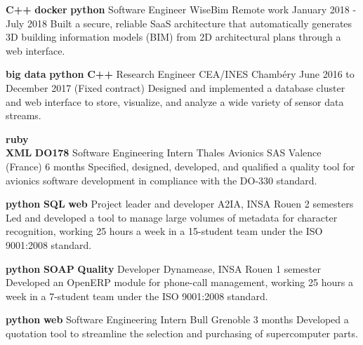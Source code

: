\documentclass[11pt,a4paper]{moderncv}
\begin{document}
  \cventry
    {\textbf{C++} \textbf{docker} \textbf{python}}
    {Software Engineer}
    {WiseBim}
    {Remote work}
    {January 2018 - July 2018}{
      Built a secure, reliable SaaS architecture that automatically generates 3D
	  building information models (BIM) from 2D architectural plans through a web
	  interface.
    }

  \cventry
    {\textbf{big data} \textbf{python} \textbf{C++}}
    {Research Engineer}
    {CEA/INES}
    {Chambéry}
    {June 2016 to December 2017 (Fixed contract)}{
      Designed and implemented a database cluster and web interface to store,
      visualize, and analyze a wide variety of sensor data streams.
    }

  \cventry
    {\textbf{ruby} \\ \textbf{XML} \textbf{DO178}}
    {Software Engineering Intern}
    {Thales Avionics SAS}
    {Valence (France)}
    {6 months}{
      Specified, designed, developed, and qualified a quality tool for avionics
      software development in compliance with the DO-330 standard.
    }

  \cventry
    {\textbf{python} \textbf{SQL} \textbf{web}}
    {Project leader and developer}
    {A2IA, INSA}
    {Rouen}
    {2 semesters }{
      Led and developed a tool to manage large volumes of metadata for character
      recognition, working 25 hours a week in a 15-student team under the
      ISO 9001:2008 standard.
    }

  \cventry
    {\textbf{python} \textbf{SOAP} \textbf{Quality}}
    {Developer}
    {Dynamease, INSA}
    {Rouen}
    {1 semester }{
       Developed an OpenERP module for phone-call management, working 25 hours a
       week in a 7-student team under the ISO 9001:2008 standard.
    }

  \cventry
    {\textbf{python} \textbf{web}}
    {Software Engineering Intern}
    {Bull}
    {Grenoble}
    {3 months}{
      Developed a quotation tool to streamline the selection and purchasing of
      supercomputer parts.
    }

\end{document}
